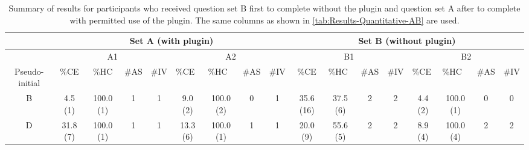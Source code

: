 \begin{landscape}
  \begin{table}
    \footnotesize
    \caption{
      Summary of results for participants who received question set B first to complete without the plugin and question set A after to complete with permitted use of the plugin.
      The same columns as shown in \autoref{tab:Results-Quantitative-AB} are used.
    }
    \centering
    \begin{tabular}{@{}ccccccccccccccccc@{}}
      \toprule
      \multicolumn{1}{l}{}                & \multicolumn{8}{c}{Set A (with plugin)}                                                                                                                              & \multicolumn{8}{c}{Set B (without plugin)}                                                                                                                                                              \\ \midrule
      \multicolumn{1}{c|}{}               & \multicolumn{4}{c|}{A1}                                 & \multicolumn{4}{c|}{A2}                                                                                    & \multicolumn{4}{c|}{B1}                                                                     & \multicolumn{4}{c}{B2}                                                                                    \\ \midrule
      \multicolumn{1}{c|}{Pseudo-initial} & \%CE     & \%HC      & \#AS & \multicolumn{1}{l|}{\#IV} & \multicolumn{1}{l}{\%CE} & \multicolumn{1}{l}{\%HC} & \multicolumn{1}{l}{\#AS} & \multicolumn{1}{l|}{\#IV} & \%CE      & \multicolumn{1}{l}{\%HC} & \multicolumn{1}{l}{\#AS} & \multicolumn{1}{l|}{\#IV} & \multicolumn{1}{l}{\%CE} & \multicolumn{1}{l}{\%HC} & \multicolumn{1}{l}{\#AS} & \multicolumn{1}{l}{\#IV} \\ \midrule
      \multicolumn{1}{c|}{B}              & 4.5 (1)  & 100.0 (1) & 1    & \multicolumn{1}{c|}{1}    & 9.0 (2)                  & 100.0 (2)                & 0                        & \multicolumn{1}{c|}{1}    & 35.6 (16) & 37.5 (6)                 & 2                        & \multicolumn{1}{c|}{2}    & 4.4 (2)                  & 100.0 (1)                & 0                        & 0                        \\
      \multicolumn{1}{c|}{D}              & 31.8 (7) & 100.0 (1) & 1    & \multicolumn{1}{c|}{1}    & 13.3 (6)                 & 100.0 (1)                & 1                        & \multicolumn{1}{c|}{1}    & 20.0 (9)  & 55.6 (5)                 & 2                        & \multicolumn{1}{c|}{2}    & 8.9 (4)                  & 100.0 (4)                & 2                        & 2                        \\

\end{tabular}
\end{table}
\end{landscape}
